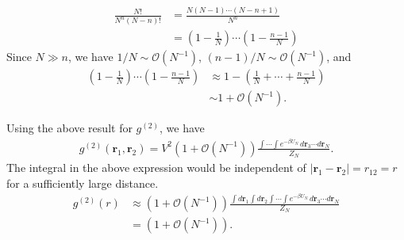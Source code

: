 \documentclass[twocolumn, 10pt]{article}
\numberwithin{equation}{section}
\newenvironment{solution}[1][\empty]
{\par\medskip
  \textbf{\ifx\empty#1{Solution.}\relax\else{#1}\fi} \ignorespaces}
{\medskip}
\begin{document}
\begin{solution}
  \begin{align*}
    \frac{ N! } { N^n (N-n)! }
    &=
    \frac{ N(N-1)\cdots (N-n+1) }
      { N^n }
    \\
    &=
    \left(1 - \frac{1}{N}\right)
    \cdots
    \left(1 - \frac{n-1}{N}\right)
  \end{align*}
  Since $N \gg n$, we have
  $1/N \sim \mathcal O(N^{-1})$,
  $(n-1)/N \sim \mathcal O(N^{-1})$,
  and
  \begin{align*}
    \left(1 - \frac{1}{N}\right)
    \cdots
    \left(1 - \frac{n-1}{N}\right)
    &\approx
    1-\left(
    \frac{1}{N}
    + \cdots +
    \frac{n-1}{N}
    \right)
    \\
    &\sim
    1 + \mathcal O(N^{-1}).
  \end{align*}
  
  Using the above result for $g^{(2)}$, we have
  \begin{align*}
    g^{(2)}(\mathbf r_1, \mathbf r_2)
    =
    V^2(1 + \mathcal O(N^{-1}))
    \frac{
      \int\cdots\int e^{-\beta U_N} \, d\mathbf r_{3}\cdots d\mathbf r_N
    } { Z_N }
    .
  \end{align*}
  The integral in the above expression
  would be independent of
  $|\mathbf r_1 - \mathbf r_2| = r_{12} = r$
  for a sufficiently large distance.
  \begin{align*}
    g^{(2)}(r)
    &\approx
    (1 + \mathcal O(N^{-1}))
    \frac{\int d\mathbf r_1 \int d\mathbf r_2
      \int\cdots\int e^{-\beta U_N} \, d\mathbf r_{3}\cdots d\mathbf r_N
    } { Z_N }
    \\
    &=
    (1 + \mathcal O(N^{-1})).
  \end{align*}
\end{solution}

%
%
%
%
\end{document}
